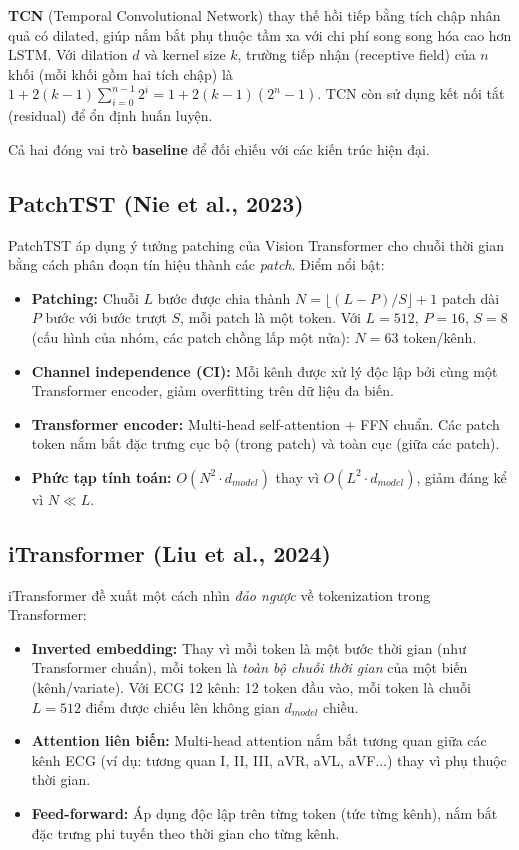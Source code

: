 \documentclass[12pt,a4paper]{report}
\begin{document}
\textbf{TCN} (Temporal Convolutional Network) \cite{bai2018tcn} thay thế hồi tiếp bằng tích chập nhân quả có dilated, giúp nắm bắt phụ thuộc tầm xa với chi phí song song hóa cao hơn LSTM. Với dilation $d$ và kernel size $k$, trường tiếp nhận (receptive field) của $n$ khối (mỗi khối gồm hai tích chập) là $1 + 2(k-1)\sum_{i=0}^{n-1} 2^i = 1 + 2(k-1)(2^n-1)$. TCN còn sử dụng kết nối tắt (residual) để ổn định huấn luyện.

Cả hai đóng vai trò \textbf{baseline} để đối chiếu với các kiến trúc hiện đại.

\subsection{PatchTST (Nie et al., 2023)}

PatchTST \cite{nie2023} áp dụng ý tưởng patching của Vision Transformer cho chuỗi thời gian bằng cách phân đoạn tín hiệu thành các \textit{patch}. Điểm nổi bật:

\begin{itemize}
  \item \textbf{Patching:} Chuỗi $L$ bước được chia thành $N = \lfloor (L-P)/S \rfloor + 1$ patch dài $P$ bước với bước trượt $S$, mỗi patch là một token. Với $L = 512$, $P = 16$, $S = 8$ (cấu hình của nhóm, các patch chồng lấp một nửa): $N = 63$ token/kênh.
  \item \textbf{Channel independence (CI):} Mỗi kênh được xử lý độc lập bởi cùng một Transformer encoder, giảm overfitting trên dữ liệu đa biến.
  \item \textbf{Transformer encoder:} Multi-head self-attention + FFN chuẩn. Các patch token nắm bắt đặc trưng cục bộ (trong patch) và toàn cục (giữa các patch).
  \item \textbf{Phức tạp tính toán:} $O(N^2 \cdot d_{model})$ thay vì $O(L^2 \cdot d_{model})$, giảm đáng kể vì $N \ll L$.
\end{itemize}

\subsection{iTransformer (Liu et al., 2024)}

iTransformer \cite{liu2024} đề xuất một cách nhìn \textit{đảo ngược} về tokenization trong Transformer:

\begin{itemize}
  \item \textbf{Inverted embedding:} Thay vì mỗi token là một bước thời gian (như Transformer chuẩn), mỗi token là \textit{toàn bộ chuỗi thời gian} của một biến (kênh/variate). Với ECG 12 kênh: 12 token đầu vào, mỗi token là chuỗi $L = 512$ điểm được chiếu lên không gian $d_{model}$ chiều.
  \item \textbf{Attention liên biến:} Multi-head attention nắm bắt tương quan giữa các kênh ECG (ví dụ: tương quan I, II, III, aVR, aVL, aVF...) thay vì phụ thuộc thời gian.
  \item \textbf{Feed-forward:} Áp dụng độc lập trên từng token (tức từng kênh), nắm bắt đặc trưng phi tuyến theo thời gian cho từng kênh.
\end{itemize}
\end{document}
